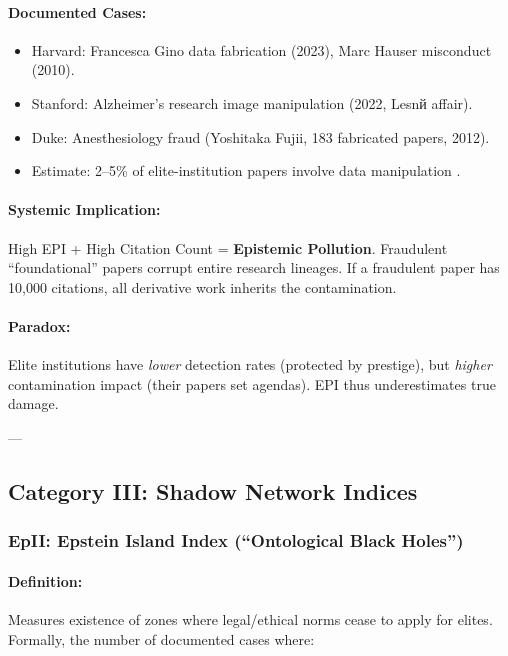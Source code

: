 \documentclass[11pt,a4paper]{article}
\theoremstyle{definition}
\theoremstyle{remark}
\begin{document}
\paragraph{Documented Cases:}
\begin{itemize}
\item Harvard: Francesca Gino data fabrication (2023), Marc Hauser misconduct (2010).
\item Stanford: Alzheimer's research image manipulation (2022, Lesnй affair).
\item Duke: Anesthesiology fraud (Yoshitaka Fujii, 183 fabricated papers, 2012).
\item Estimate: 2–5\% of elite-institution papers involve data manipulation \cite{nat_misconduct}.
\end{itemize}

\paragraph{Systemic Implication:}
High EPI + High Citation Count = \textbf{Epistemic Pollution}. Fraudulent ``foundational'' papers corrupt entire research lineages. If a fraudulent paper has 10,000 citations, all derivative work inherits the contamination.

\paragraph{Paradox:}
Elite institutions have \textit{lower} detection rates (protected by prestige), but \textit{higher} contamination impact (their papers set agendas). EPI thus underestimates true damage.

---

\subsection{Category III: Shadow Network Indices}

\subsubsection{EpII: Epstein Island Index (``Ontological Black Holes'')}

\paragraph{Definition:}
Measures existence of zones where legal/ethical norms cease to apply for elites. Formally, the number of documented cases where:
\end{document}
